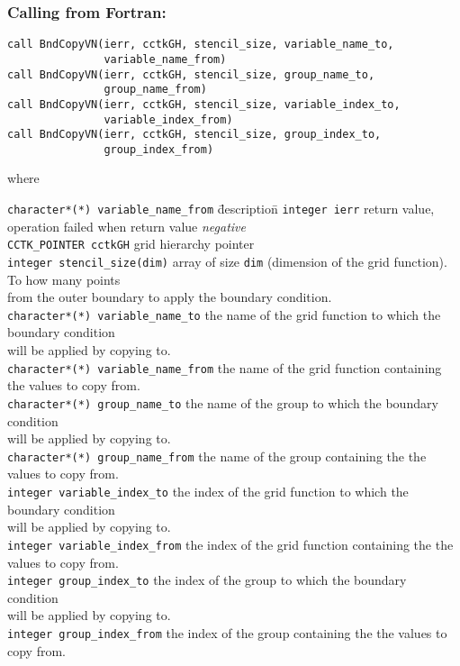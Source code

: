 \documentclass{article}
\begin{document}
\subsubsection*{Calling from Fortran:}
\begin{verbatim}
call BndCopyVN(ierr, cctkGH, stencil_size, variable_name_to,  
               variable_name_from)
call BndCopyVN(ierr, cctkGH, stencil_size, group_name_to,     
               group_name_from)
call BndCopyVN(ierr, cctkGH, stencil_size, variable_index_to, 
               variable_index_from)
call BndCopyVN(ierr, cctkGH, stencil_size, group_index_to,    
               group_index_from)
\end{verbatim}
where
\begin{tabbing}
{\tt character*(*) variable\_name\_from} \= description\=\kill
{\tt integer ierr} \> return value, operation failed when return
value {\em negative}\\
{\tt CCTK\_POINTER cctkGH} \> grid hierarchy pointer\\
{\tt integer stencil\_size(dim)} \> array of size {\tt dim} (dimension of the grid function).  To how many points \\
\> from the outer boundary to apply the boundary condition. \\

{\tt character*(*) variable\_name\_to} \> the name of the grid function 
	to which the boundary condition\\
\> will be applied by copying to.\\
{\tt character*(*) variable\_name\_from} \> the name of the grid function 
    containing the values to copy from.\\

{\tt character*(*) group\_name\_to} \> the name of the group
	to which the boundary condition\\
\> will be applied by copying to.\\
{\tt character*(*) group\_name\_from} \> the name of the group
    containing the the values to copy from.\\

{\tt integer variable\_index\_to} \> the index of the grid function 
	to which the boundary condition\\
\> will be applied by copying to.\\
{\tt integer variable\_index\_from} \> the index of the grid function 
    containing the the values to copy from.\\

{\tt integer group\_index\_to} \> the index of the group
	to which the boundary condition\\
\> will be applied by copying to.\\
{\tt integer group\_index\_from} \> the index of the group
    containing the the values to copy from.
\end{tabbing}
\end{document}
